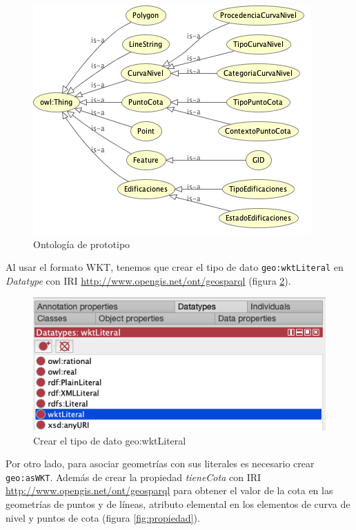 \begin{figure}[H]
	\centering
	\includegraphics[width=0.7\linewidth]{imagenes/capitulo5/ontologia}
	\caption{Ontología de prototipo}
	\label{fig:ontologia}
\end{figure}

Al usar el formato WKT, tenemos que crear el tipo de dato \texttt{geo:wktLiteral} en \textit{Datatype} con IRI \url{http://www.opengis.net/ont/geosparql} (figura \ref{fig:datatype}).


\begin{figure}[H]
	\centering
	\includegraphics[width=0.75\linewidth]{imagenes/capitulo5/datatype}
	\caption{Crear el tipo de dato geo:wktLiteral}
	\label{fig:datatype}
\end{figure}

Por otro lado, para asociar geometrías con sus literales es necesario crear \texttt{geo:asWKT}. Además de crear la propiedad \textit{tieneCota} con IRI \url{http://www.opengis.net/ont/geosparql} para obtener el valor de la cota en las geometrías de puntos y de líneas, atributo elemental en los elementos de curva de nivel y puntos de cota (figura \ref{fig:propiedad}).





